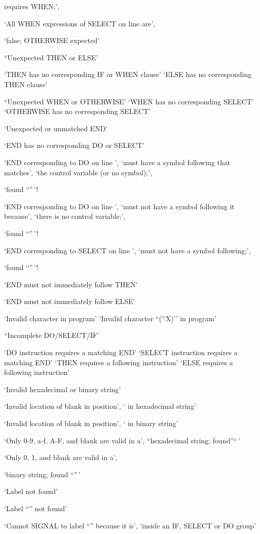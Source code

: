 requires WHEN;',

`All WHEN expressions of SELECT on line are',

`false; OTHERWISE expected'

``Unexpected THEN or ELSE'

`THEN has no corresponding IF or WHEN clause' `ELSE has no corresponding
THEN clause'

``Unexpected WHEN or OTHERWISE' `WHEN has no corresponding SELECT'
`OTHERWISE has no corresponding SELECT'

`Unexpected or unmatched END'

`END has no corresponding DO or SELECT'

`END corresponding to DO on line ', `must have a symbol following that
matches', `the control variable (or no symbol);',

`found ``''\,'!

`END corresponding to DO on line ', `must not have a symbol following it
because', `there is no control variable;',

`found ``''\,'!

`END corresponding to SELECT on line ', `must not have a symbol
following;',

`found ``''\,'!

`END must not immediately follow THEN'

`END must not immediately follow ELSE'

`Invalid character in program' `Invalid character ``('`X)'' in program'

``Incomplete DO/SELECT/IF'

`DO instruction requires a matching END' `SELECT instruction requires a
matching END' `THEN requires a following instruction' `ELSE requires a
following instruction'

`Invalid hexadecimal or binary string'

`Invalid location of blank in position', ` in hexadecimal string'

`Invalid location of blank in position', ` in binary string'

`Only 0-9, a-f, A-F, and blank are valid in a', ``hexadecimal string;
found''``\,'

`Only 0, 1, and blank are valid in a',

`binary string; found ``''\,'

`Label not found'

`Label ``'' not found'

`Cannot SIGNAL to label ``'' because it is', `inside an IF, SELECT or DO
group'

